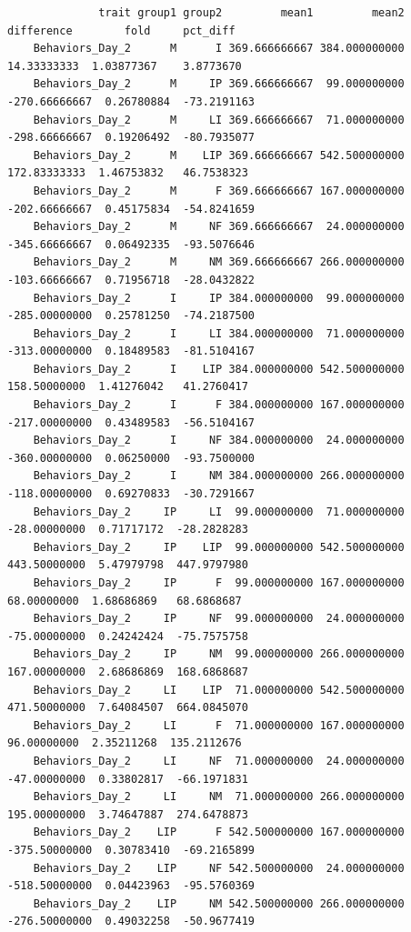 \documentclass[
  landscape]{article}
\begin{document}
\begin{verbatim}
              trait group1 group2         mean1         mean2    difference        fold     pct_diff
    Behaviors_Day_2      M      I 369.666666667 384.000000000   14.33333333  1.03877367    3.8773670
    Behaviors_Day_2      M     IP 369.666666667  99.000000000 -270.66666667  0.26780884  -73.2191163
    Behaviors_Day_2      M     LI 369.666666667  71.000000000 -298.66666667  0.19206492  -80.7935077
    Behaviors_Day_2      M    LIP 369.666666667 542.500000000  172.83333333  1.46753832   46.7538323
    Behaviors_Day_2      M      F 369.666666667 167.000000000 -202.66666667  0.45175834  -54.8241659
    Behaviors_Day_2      M     NF 369.666666667  24.000000000 -345.66666667  0.06492335  -93.5076646
    Behaviors_Day_2      M     NM 369.666666667 266.000000000 -103.66666667  0.71956718  -28.0432822
    Behaviors_Day_2      I     IP 384.000000000  99.000000000 -285.00000000  0.25781250  -74.2187500
    Behaviors_Day_2      I     LI 384.000000000  71.000000000 -313.00000000  0.18489583  -81.5104167
    Behaviors_Day_2      I    LIP 384.000000000 542.500000000  158.50000000  1.41276042   41.2760417
    Behaviors_Day_2      I      F 384.000000000 167.000000000 -217.00000000  0.43489583  -56.5104167
    Behaviors_Day_2      I     NF 384.000000000  24.000000000 -360.00000000  0.06250000  -93.7500000
    Behaviors_Day_2      I     NM 384.000000000 266.000000000 -118.00000000  0.69270833  -30.7291667
    Behaviors_Day_2     IP     LI  99.000000000  71.000000000  -28.00000000  0.71717172  -28.2828283
    Behaviors_Day_2     IP    LIP  99.000000000 542.500000000  443.50000000  5.47979798  447.9797980
    Behaviors_Day_2     IP      F  99.000000000 167.000000000   68.00000000  1.68686869   68.6868687
    Behaviors_Day_2     IP     NF  99.000000000  24.000000000  -75.00000000  0.24242424  -75.7575758
    Behaviors_Day_2     IP     NM  99.000000000 266.000000000  167.00000000  2.68686869  168.6868687
    Behaviors_Day_2     LI    LIP  71.000000000 542.500000000  471.50000000  7.64084507  664.0845070
    Behaviors_Day_2     LI      F  71.000000000 167.000000000   96.00000000  2.35211268  135.2112676
    Behaviors_Day_2     LI     NF  71.000000000  24.000000000  -47.00000000  0.33802817  -66.1971831
    Behaviors_Day_2     LI     NM  71.000000000 266.000000000  195.00000000  3.74647887  274.6478873
    Behaviors_Day_2    LIP      F 542.500000000 167.000000000 -375.50000000  0.30783410  -69.2165899
    Behaviors_Day_2    LIP     NF 542.500000000  24.000000000 -518.50000000  0.04423963  -95.5760369
    Behaviors_Day_2    LIP     NM 542.500000000 266.000000000 -276.50000000  0.49032258  -50.9677419

\end{verbatim}
\end{document}
